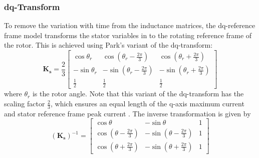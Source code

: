 \subsubsection{dq-Transform}
To remove the variation with time from the inductance matrices, the dq-reference frame model transforms the stator variables in to the rotating reference frame of the rotor. 
This is achieved using Park's variant of the dq-transform:
%
\begin{equation}
\mathbf{K_s} = \frac{2}{3}
 \begin{bmatrix} 
  \cos \theta_r & \cos(\theta_r-\frac{2\pi}{3}) & \cos(\theta_r+\frac{2\pi}{3}) \\
  -\sin \theta_r & -\sin(\theta_r-\frac{2\pi}{3}) & -\sin(\theta_r+\frac{2\pi}{3}) \\
  \frac{1}{2} & \frac{1}{2} & \frac{1}{2}
 \end{bmatrix}
\end{equation}
%
where $\theta_r$ is the rotor angle.
Note that this variant of the dq-transform has the scaling factor $\frac{2}{3}$, which ensures an equal length of the q-axis maximum current and stator reference frame peak current \cite{kundur1994power}.
The inverse transformation is given by
%
\begin{equation}
(\mathbf{K_s})^{-1} = 
 \begin{bmatrix} 
  \cos \theta & -\sin \theta & 1 \\
  \cos(\theta-\frac{2\pi}{3}) & -\sin(\theta-\frac{2\pi}{3}) & 1 \\
  \cos(\theta+\frac{2\pi}{3}) & -\sin(\theta+\frac{2\pi}{3}) & 1
 \end{bmatrix}
\end{equation}

